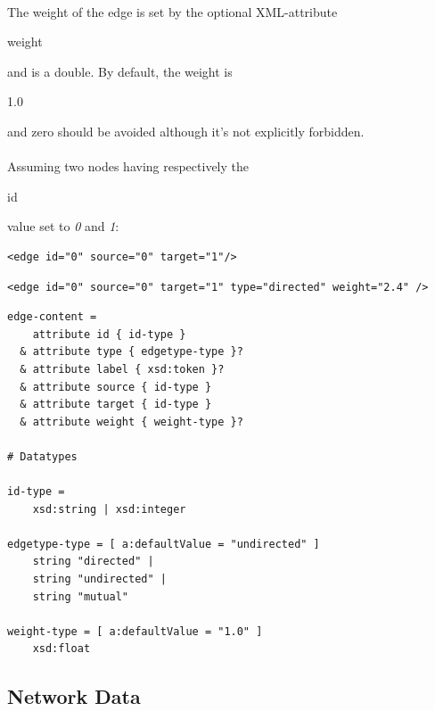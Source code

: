 \documentclass[a4paper,10pt]{article}
\begin{document}
\paragraph{}
The weight of the edge is set by the optional XML-attribute \begin{footnotesize}weight\end{footnotesize} and is a double. By default, the weight is \begin{footnotesize}1.0\end{footnotesize} and zero should be avoided although it's not explicitly forbidden.

\paragraph{}
Assuming two nodes having respectively the \begin{footnotesize}id\end{footnotesize} value set to \textit{0} and \textit{1}:

\lstset{ style=gexf }
\begin{lstlisting}[caption={An edge!},label=anEdge]
<edge id="0" source="0" target="1"/>
\end{lstlisting}

\lstset{ style=gexf }
\begin{lstlisting}[caption={A more complete edge},label=aMoreEdge]
<edge id="0" source="0" target="1" type="directed" weight="2.4" />
\end{lstlisting}

\lstset{ style=rnc }
\begin{lstlisting}[caption={Edge Specification},label=edgeRNC]
edge-content =
    attribute id { id-type }
  & attribute type { edgetype-type }?
  & attribute label { xsd:token }?
  & attribute source { id-type }
  & attribute target { id-type }
  & attribute weight { weight-type }?

# Datatypes

id-type =
    xsd:string | xsd:integer

edgetype-type = [ a:defaultValue = "undirected" ]
    string "directed" |
    string "undirected" |
    string "mutual"

weight-type = [ a:defaultValue = "1.0" ]
    xsd:float
\end{lstlisting}

\subsection{Network Data} \label{networkdata}
\end{document}
